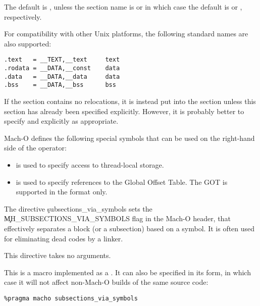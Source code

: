 The default is , unless the section name is  or
 in which case the default is  or ,
respectively.

For compatibility with other Unix platforms, the following standard
names are also supported:

\begin{lstlisting}
.text   = __TEXT,__text     text
.rodata = __DATA,__const    data
.data   = __DATA,__data     data
.bss    = __DATA,__bss      bss
\end{lstlisting}

If the  section contains no relocations, it is instead put
into the  section unless this section has already
been specified explicitly. However, it is probably better to specify
 and  explicitly as appropriate.


Mach-O defines the following special symbols that can be used on the
right-hand side of the  operator:

\begin{itemize}
    \item{ is used to specify access to thread-local storage.}
    \item{ is used to specify references to the Global Offset Table.
        The GOT is supported in the  format only.}
\end{itemize}


The directive \c{subsections\_via\_symbols} sets the
\c{MH\_SUBSECTIONS\_VIA\_SYMBOLS} flag in the Mach-O header, that effectively
separates a block (or a subsection) based on a symbol. It is often used
for eliminating dead codes by a linker.

This directive takes no arguments.

This is a macro implemented as a . It can also be
specified in its  form, in which case it will not affect
non-Mach-O builds of the same source code:

\begin{lstlisting}
%pragma macho subsections_via_symbols
\end{lstlisting}

